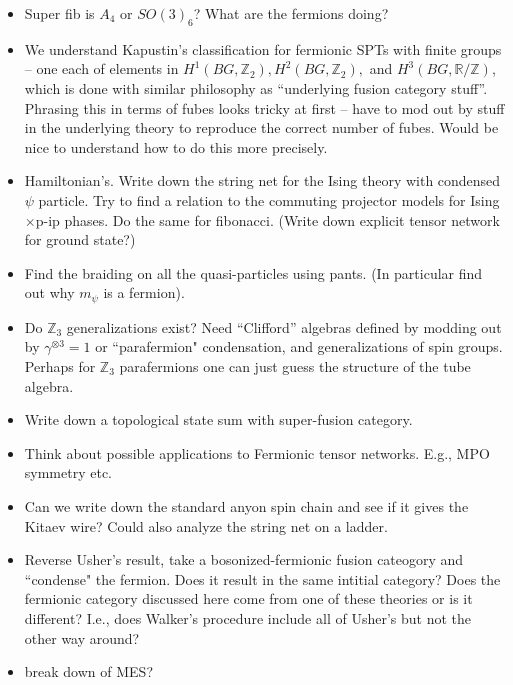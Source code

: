 \documentclass[12pt,a4paper]{article}
\newcommand{\tp}{\otimes}
\newcommand{\zz}{\mathbb{Z}}
\newcommand{\rr}{\mathbb{R}}
\newcommand{\zt}{\mathbb{Z}_2}
\begin{document}
\begin{itemize}
    \item Super fib is $A_4$ or $SO(3)_6$? What are the fermions doing?
    \item We understand Kapustin's classification for fermionic SPTs with finite groups -- one each of elements in $H^1(BG,\zt),H^2(BG,\zt),$ and $H^3(BG,\rr/\zz)$, which is done with similar philosophy as ``underlying fusion category stuff''. Phrasing this in terms of fubes looks tricky at first -- have to mod out by stuff in the underlying theory to reproduce the correct number of fubes. Would be nice to understand how to do this more precisely. 
    \item Hamiltonian's. Write down the string net for the Ising theory with condensed $\psi$ particle.
    Try to find a relation to the commuting projector models for Ising$\times$p-ip phases. 
    Do the same for fibonacci.
    (Write down explicit tensor network for ground state?)
    \item Find the braiding on all the quasi-particles using pants. (In particular find out why $m_\psi$ is a fermion). 
    \item Do $\mathbb{Z}_3$ generalizations exist? Need ``Clifford'' algebras defined by modding out by $\gamma^{\tp 3} = 1$ or ``parafermion" condensation, and generalizations of spin groups.
    Perhaps for $\mathbb{Z}_3$ parafermions one can just guess the structure of the tube algebra.
    \item Write down a topological state sum with super-fusion category. 
    \item Think about possible applications to Fermionic tensor networks. E.g., MPO symmetry etc. 
    \item Can we write down the standard anyon spin chain and see if it gives the Kitaev wire? Could also analyze the string net on a ladder. 
    \item Reverse Usher's result, take a bosonized-fermionic fusion cateogory and ``condense" the fermion. Does it result in the same intitial category? Does the fermionic category discussed here come from one of these theories or is it different? I.e., does Walker's procedure include all of Usher's but not the other way around?
    \item break down of MES?
\end{itemize}
\end{document}
